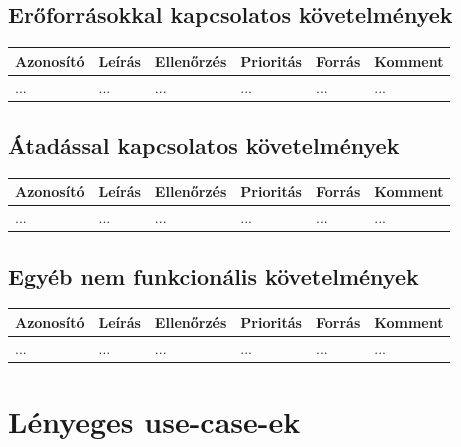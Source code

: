 \subsection{Erőforrásokkal kapcsolatos követelmények}


\begin{longtable}{| l | l | l | l | l | l |}
\hline
\textbf{Azonosító}   & \textbf{Leírás} & \textbf{Ellenőrzés} & \textbf{Prioritás} & \textbf{Forrás} & \textbf{Komment} \tabularnewline
\hline\hline
... & ... & ... & ... & ... & ... \tabularnewline
\hline
\end{longtable}


\subsection{Átadással kapcsolatos követelmények}

\begin{longtable}{| l | l | l | l | l | l |}
\hline
\textbf{Azonosító}   & \textbf{Leírás} & \textbf{Ellenőrzés} & \textbf{Prioritás} & \textbf{Forrás} & \textbf{Komment} \tabularnewline
\hline\hline
... & ... & ... & ... & ... & ... \tabularnewline
\hline
\end{longtable}

\subsection{Egyéb nem funkcionális követelmények}

\begin{longtable}{| l | l | l | l | l | l |}
\hline
\textbf{Azonosító}   & \textbf{Leírás} & \textbf{Ellenőrzés} & \textbf{Prioritás} & \textbf{Forrás} & \textbf{Komment} \tabularnewline
\hline\hline
... & ... & ... & ... & ... & ... \tabularnewline
\hline
\end{longtable}


\section{Lényeges use-case-ek}


